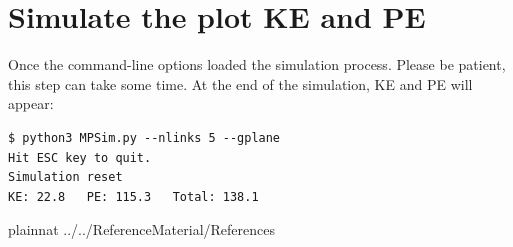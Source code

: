 \documentclass[12pt, titlepage]{article}
\begin{document}
\section{Simulate the plot KE and PE}

Once the command-line options loaded the simulation process. 
Please be patient, this step can take some time. 
At the end of the simulation, KE and PE will appear:

\begin{lstlisting}
$ python3 MPSim.py --nlinks 5 --gplane
Hit ESC key to quit.
Simulation reset
KE: 22.8   PE: 115.3   Total: 138.1
\end{lstlisting}

 {plainnat}
 {../../ReferenceMaterial/References}
\end{document}
